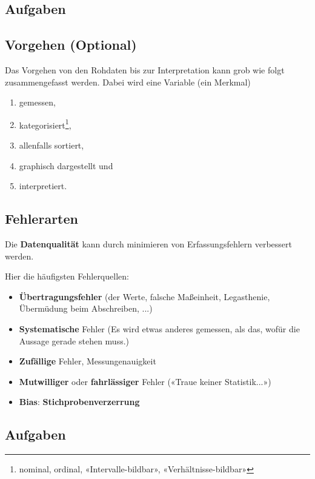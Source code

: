 \subsection*{Aufgaben}

\subsection{Vorgehen (Optional)}
Das Vorgehen von den Rohdaten bis zur Interpretation kann grob wie folgt zusammengefasst werden. Dabei wird eine Variable (ein Merkmal)
\begin{enumerate}
\item gemessen,
\item kategorisiert\footnote{nominal, ordinal, «Intervalle-bildbar»,
    «Verhältnisse-bildbar»},
\item allenfalls sortiert,
\item graphisch dargestellt und
\item interpretiert.
\end{enumerate}
\newpage


\subsection{Fehlerarten}


Die \textbf{Datenqualität} kann durch minimieren
von Erfassungsfehlern verbessert werden.

Hier die häufigsten Fehlerquellen:


\begin{itemize}
  
\item \textbf{Übertragungsfehler} (der Werte, \zB falsche Maßeinheit,
  Legasthenie, Übermüdung beim Abschreiben, ...)

\item \textbf{Systematische} Fehler (Es wird etwas anderes gemessen, als das,
  wofür die Aussage gerade stehen muss.)

\item \textbf{Zufällige} Fehler, Messungenauigkeit

\item \textbf{Mutwilliger} oder \textbf{fahrlässiger} Fehler («Traue keiner Statistik...»)

\item \textbf{Bias}: \textbf{Stichprobenverzerrung}
\end{itemize}

\subsection*{Aufgaben}
\newpage
